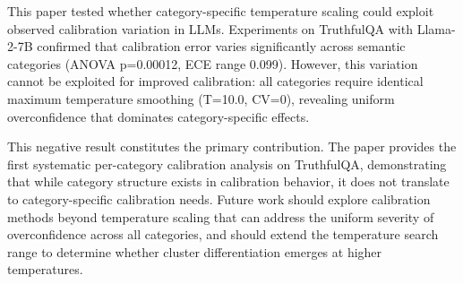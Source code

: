 
This paper tested whether category-specific temperature scaling could exploit observed calibration variation in LLMs. Experiments on TruthfulQA with Llama-2-7B confirmed that calibration error varies significantly across semantic categories (ANOVA p=0.00012, ECE range 0.099). However, this variation cannot be exploited for improved calibration: all categories require identical maximum temperature smoothing (T=10.0, CV=0), revealing uniform overconfidence that dominates category-specific effects.

This negative result constitutes the primary contribution. The paper provides the first systematic per-category calibration analysis on TruthfulQA, demonstrating that while category structure exists in calibration behavior, it does not translate to category-specific calibration needs. Future work should explore calibration methods beyond temperature scaling that can address the uniform severity of overconfidence across all categories, and should extend the temperature search range to determine whether cluster differentiation emerges at higher temperatures.
